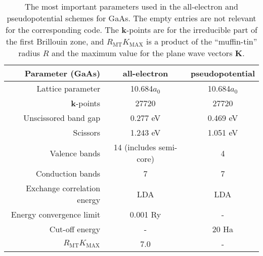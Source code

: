 \documentclass[floatfix,prb,aps,superscriptaddress,11pt]{revtex4}
\begin{document}
\begin{table}[b]
\begin{center}
\begin{tabular}{|r|c|c|}
\hline
Parameter (GaAs) & all-electron & pseudopotential \\ \hline
Lattice parameter & 10.684$a_0$ & 10.684$a_0$ \\ 
$\mathbf{k}$-points  & 27720 & 27720 \\ 
Unscissored band gap & 0.277 eV & 0.469 eV \\ 
Scissors & 1.243 eV & 1.051 eV \\ 
Valence bands & 14 (includes semi-core) & 4 \\ 
Conduction bands & 7 & 7 \\ 
Exchange correlation energy & LDA & LDA \\ 
Energy convergence limit & 0.001 Ry & - \\ 
Cut-off energy & - & 20 Ha \\ 
$R_{\mathrm{MT}}K_{\mathrm{MAX}}$ & 7.0 & - \\ \hline
\end{tabular}
\end{center}
\caption{The most important parameters used in the all-electron and
pseudopotential schemes for GaAs. The empty entries are not relevant for the
corresponding code. The $\mathbf{k}$-points are for the irreducible part of
the first Brillouin zone, and $R_{\mathrm{MT}}K_{\mathrm{MAX}}$
is a product of the ``muffin-tin'' radius $R$ 
and the maximum value for the plane wave vectors $\mathbf{K}$.\cite{wien2k} 
}
\label{tabla}
\end{table}
\end{document}
